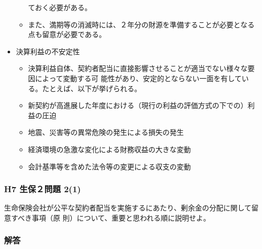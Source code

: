 \documentclass[report,gutter=10mm,fore-edge=10mm,uplatex,dvipdfmx]{jlreq}
\begin{document}
\begin{itemize}
\begin{itemize}
 ておく必要がある。
\item  また、満期等の消滅時には、２年分の財源を準備することが必要となる点も留意が必要である。
\end{itemize} 
\item 決算利益の不安定性
\begin{itemize}
 \item  決算利益自体、契約者配当に直接影響させることが適当でない様々な要因によって変動する可
 能性があり、安定的とならない一面を有している。たとえば、以下が挙げられる。
\item 新契約が高進展した年度における（現行の利益の評価方式の下での）利益の圧迫
\item 地震、災害等の異常危険の発生による損失の発生
\item 経済環境の急激な変化による財務収益の大きな変動
\item 会計基準等を含めた法令等の変更による収支の変動
\end{itemize}
\end{itemize}

\subsubsection{H7 生保２問題 2(1)}
生命保険会社が公平な契約者配当を実施するにあたり、剰余金の分配に関して留意すべき事項（原
則）について、重要と思われる順に説明せよ。

\subsubsection{解答}
\end{document}
